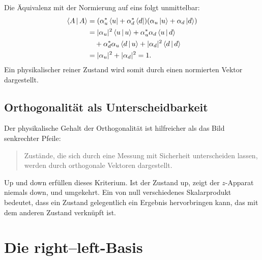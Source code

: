 Die Äquivalenz mit der Normierung auf eins folgt unmittelbar:
\begin{align}
\left\langle A\,\middle|\,A\right\rangle
&=(\alpha_u^*\left\langle u\right\rvert+\alpha_d^*\left\langle d\right\rvert)
  (\alpha_u\left\lvert u\right\rangle+\alpha_d\left\lvert d\right\rangle)\\
&=|\alpha_u|^2\left\langle u\,\middle|\,u\right\rangle
 +\alpha_u^*\alpha_d\left\langle u\,\middle|\,d\right\rangle\\
&\quad +\alpha_d^*\alpha_u\left\langle d\,\middle|\,u\right\rangle
 +|\alpha_d|^2\left\langle d\,\middle|\,d\right\rangle\\
&=|\alpha_u|^2+|\alpha_d|^2=1.
\end{align}
Ein physikalischer reiner Zustand wird somit durch einen normierten Vektor dargestellt.

\begin{classroomqa}
\end{classroomqa}

\subsection{Orthogonalität als Unterscheidbarkeit}

Der physikalische Gehalt der Orthogonalität ist hilfreicher als das Bild senkrechter Pfeile:

\begin{quote}Zustände, die sich durch eine Messung mit Sicherheit unterscheiden lassen, werden durch orthogonale Vektoren dargestellt.
\end{quote}

Up und down erfüllen dieses Kriterium. Ist der Zustand up, zeigt der \(z\)-Apparat niemals down, und umgekehrt. Ein von null verschiedenes Skalarprodukt bedeutet, dass ein Zustand gelegentlich ein Ergebnis hervorbringen kann, das mit dem anderen Zustand verknüpft ist.

\section{Die right--left-Basis}

